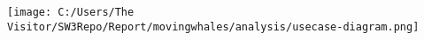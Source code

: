 \begin{center}
	\texttt{[image: C:/Users/The Visitor/SW3Repo/Report/movingwhales/analysis/usecase-diagram.png]}
\end{center}